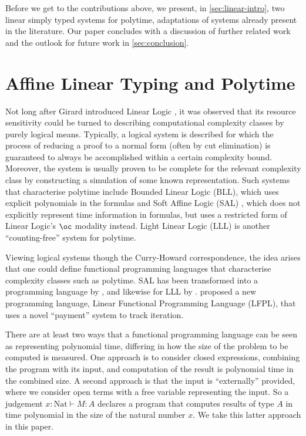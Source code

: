 \documentclass[acmsmall,screen]{acmart}
\newcommand{\tyNat}{\mathrm{Nat}}
\begin{document}
Before we get to the contributions above, we present, in
\autoref{sec:linear-intro}, two linear simply typed systems for
polytime, adaptations of systems already present in the
literature. Our paper concludes with a discussion of further related
work and the outlook for future work in \autoref{sec:conclusion}.

\section{Affine Linear Typing and Polytime}
\label{sec:linear-intro}

Not long after Girard introduced Linear Logic \cite{girard87}, it was
observed that its resource sensitivity could be turned to describing
computational complexity classes by purely logical means. Typically, a
logical system is described for which the process of reducing a proof
to a normal form (often by cut elimination) is guaranteed to always be
accomplished within a certain complexity bound. Moreover, the system
is usually proven to be complete for the relevant complexity class by
constructing a simulation of some known representation. Such systems
that characterise polytime include Bounded Linear Logic (BLL), which
uses explicit polynomials in the formulas \cite{bll92} and Soft Affine
Logic (SAL) \cite{Lafont04}, which does not explicitly represent time
information in formulas, but uses a restricted form of Linear Logic's
$\oc$ modality instead. Light Linear Logic (LLL) \cite{lll98} is
another ``counting-free'' system for polytime.

Viewing logical systems though the Curry-Howard correspondence, the
idea arises that one could define functional programming languages
that characterise complexity classes such as polytime. SAL has been
transformed into a programming language by \citet{BaillotM04}, and
likewise for LLL by \citet{BaillotGM10}. \citet{hofmann99lfpl}
proposed a new programming language, Linear Functional Programming
Language (LFPL), that uses a novel ``payment'' system to track
iteration.

There are at least two ways that a functional programming language can
be seen as representing polynomial time, differing in how the size of
the problem to be computed is measured. One approach is to consider
closed expressions, combining the program with its input, and
computation of the result is polynomial time in the combined size. A
second approach is that the input is ``externally'' provided, where we
consider open terms with a free variable representing the input. So a
judgement $x : \tyNat \vdash M : A$ declares a program that computes
results of type $A$ in time polynomial in the size of the natural
number $x$. We take this latter approach in this paper.
\end{document}
